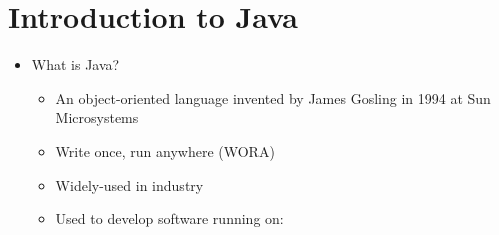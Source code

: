 
\section{Introduction to Java}
\begin{itemize}

	\item What is Java?
	\begin{itemize}
		\item An object-oriented language invented by James Gosling in 1994 at Sun Microsystems
		\item Write once, run anywhere (WORA)
		\item Widely-used in industry
		\item Used to develop software running on:
	\end{itemize}


\end{itemize}
